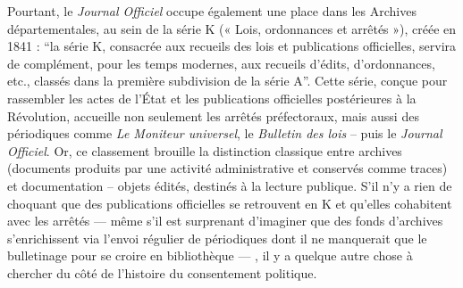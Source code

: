 Pourtant, le \emph{Journal Officiel} occupe également une place dans les Archives départementales, au sein de la série K (« Lois, ordonnances et arrêtés »), créée en 1841 : \enquote{la série K, consacrée aux recueils des lois et publications officielles, servira de complément, pour les temps modernes, aux recueils d’édits, d’ordonnances, etc., classés dans la première subdivision de la série A}. Cette série, conçue pour rassembler les actes de l’État et les publications officielles postérieures à la Révolution, accueille non seulement les arrêtés préfectoraux, mais aussi des périodiques comme \emph{Le Moniteur universel}, le \emph{Bulletin des lois} -- puis le \emph{Journal Officiel}. Or, ce classement brouille la distinction classique entre archives (documents produits par une activité administrative et conservés comme traces) et documentation -- objets édités, destinés à la lecture publique. S’il n’y a rien de choquant que des publications officielles se retrouvent en K et qu’elles cohabitent avec les arrêtés — même s’il est  surprenant d’imaginer que des fonds d’archives s’enrichissent via  l’envoi régulier de périodiques dont il ne manquerait que le bulletinage pour se croire en bibliothèque — , il y a quelque autre chose à chercher du côté de l’histoire du consentement politique.

